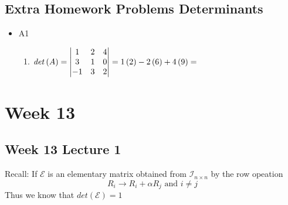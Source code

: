 \documentclass[11pt]{book}
\begin{document}

\section{Extra Homework Problems Determinants}%
\label{sec:extra_homework_problems_determinants}

\begin{itemize}
    \item A1
        \begin{enumerate}[label=\alph*)]
            \item $\mathit{det} \left(A\right) = \mat[v]{ 1 & 2 & 4 \\ 3 & 1 & 0 \\ -1 & 3 & 2 }= 1\left( 2 \right)  - 2\left( 6 \right)  + 4\left( 9 \right) = $ 
        \end{enumerate}
\end{itemize}





\chapter{Week 13}%
\label{chp:week_13}

\section{Week 13 Lecture 1}%
\label{sec:week_13_lecture_1}




Recall:
If $\mathcal{E} $ is an elementary matrix obtained from $\mathcal{I} _{n\times n} $ by the row opeation 
\[
R_{i} \to R_{i}  + \alpha R_{j} \text{ and } i \neq j
\]
Thus we know that $\mathit{det} \left(\mathcal{E} \right) = 1$ 
\end{document}
